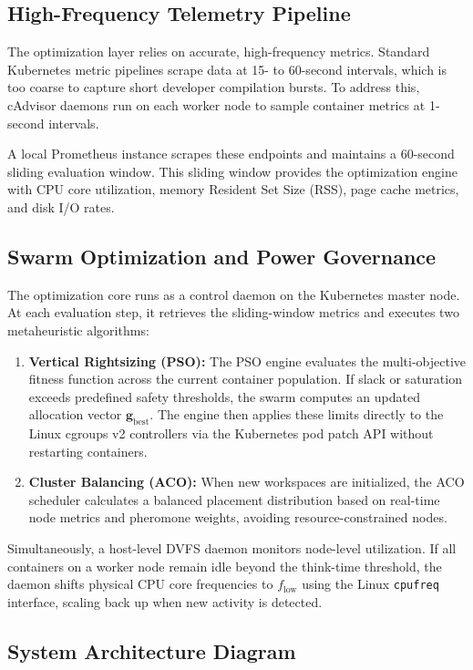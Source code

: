 \documentclass[12pt,a4paper]{report}
\begin{document}
\subsection{High-Frequency Telemetry Pipeline}
The optimization layer relies on accurate, high-frequency metrics. Standard Kubernetes metric pipelines scrape data at 15- to 60-second intervals, which is too coarse to capture short developer compilation bursts. To address this, cAdvisor daemons run on each worker node to sample container metrics at 1-second intervals.

A local Prometheus instance scrapes these endpoints and maintains a 60-second sliding evaluation window. This sliding window provides the optimization engine with CPU core utilization, memory Resident Set Size (RSS), page cache metrics, and disk I/O rates.

\subsection{Swarm Optimization and Power Governance}
The optimization core runs as a control daemon on the Kubernetes master node. At each evaluation step, it retrieves the sliding-window metrics and executes two metaheuristic algorithms:
\begin{enumerate}
    \item \textbf{Vertical Rightsizing (PSO):} The PSO engine evaluates the multi-objective fitness function across the current container population. If slack or saturation exceeds predefined safety thresholds, the swarm computes an updated allocation vector $\mathbf{g}_{\text{best}}$. The engine then applies these limits directly to the Linux cgroups v2 controllers via the Kubernetes pod patch API without restarting containers.
    \item \textbf{Cluster Balancing (ACO):} When new workspaces are initialized, the ACO scheduler calculates a balanced placement distribution based on real-time node metrics and pheromone weights, avoiding resource-constrained nodes.
\end{enumerate}

Simultaneously, a host-level DVFS daemon monitors node-level utilization. If all containers on a worker node remain idle beyond the think-time threshold, the daemon shifts physical CPU core frequencies to $f_{\text{low}}$ using the Linux \texttt{cpufreq} interface, scaling back up when new activity is detected.

\clearpage
\subsection{System Architecture Diagram}
\end{document}
